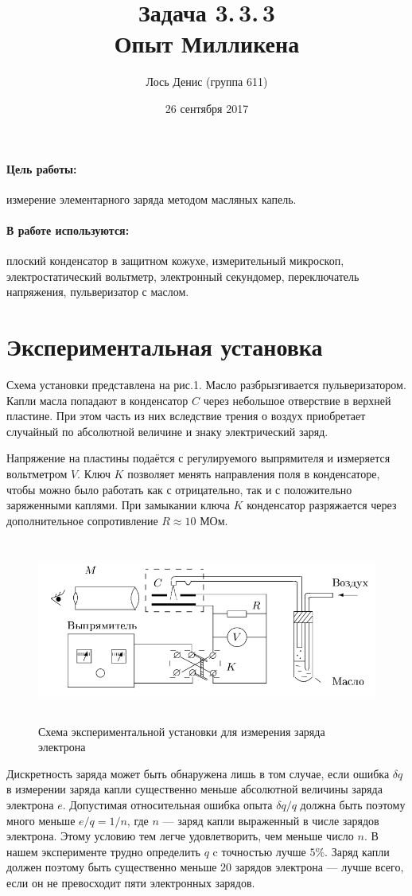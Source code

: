 \documentclass[12pt]{article}
\title{{\bf Задача 3.\,3.\,3 \\ Опыт Милликена}}
\author{Лось Денис (группа 611)}
\date{26 сентября 2017}
\begin{document}
\maketitle

\paragraph{Цель работы: } измерение элементарного заряда методом масляных капель.

\paragraph{В работе используются: } плоский конденсатор в защитном кожухе, измерительный микроскоп, электростатический вольтметр, электронный секундомер, переключатель напряжения, пульверизатор с маслом.

\section*{Экспериментальная установка}
Схема установки представлена на рис.1. Масло разбрызгивается пульверизатором. Капли масла попадают в конденсатор $C$ через небольшое отверствие в верхней пластине. При этом часть из них вследствие трения о воздух приобретает случайный по абсолютной величине и знаку электрический заряд.
\par
	Напряжение на пластины подаётся с регулируемого выпрямителя и измеряется вольтметром $V$. Ключ $K$ позволяет менять направления поля в конденсаторе, чтобы можно было работать как с отрицательно, так и с положительно заряженными каплями. При замыкании ключа $K$ конденсатор разряжается через дополнительное сопротивление $R \approx 10 $ МОм.
\begin{figure}[h!]
	\centering
	\includegraphics[width = 12cm, height = 6cm]{image1.png}
	\caption{Схема экспериментальной установки для измерения заряда электрона}	
\end{figure}	
\par
	Дискретность заряда может быть обнаружена лишь в том случае, если ошибка $\delta q$ в измерении заряда капли существенно меньше абсолютной величины заряда электрона $e$. Допустимая относительная ошибка опыта $\delta q / q$ должна быть поэтому много меньше $e / q = 1 / n$, где $n$ --- заряд капли выраженный в числе зарядов электрона. Этому условию тем легче удовлетворить, чем меньше число $n$. В нашем эксперименте трудно определить $q$ c точностью лучше $5 \%$. Заряд капли должен поэтому быть существенно меньше $20$ зарядов электрона --- лучше всего, если он не превосходит пяти электронных зарядов.
\end{document}
